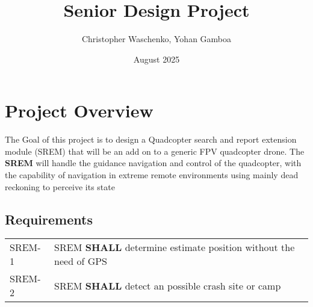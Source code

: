 \documentclass[12pt, letter]{article}
\author{Christopher Waschenko, Yohan Gamboa}
\title{Senior Design Project}
\date{August 2025}
\begin{document}
\maketitle
\newpage
\tableofcontents
\newpage

\section{Project Overview}

The Goal of this project is to design a Quadcopter search and report extension module (SREM) that will be an add on to a generic FPV quadcopter drone. The \textbf{SREM} will handle the guidance navigation and control of the quadcopter, with the capability of navigation in extreme remote environments using mainly dead reckoning to perceive its state

\subsection{Requirements}
\begin{tabular}{l l}
SREM-1 & SREM \textbf{SHALL} determine estimate position without the need of GPS \\
SREM-2 & SREM \textbf{SHALL} detect an possible crash site or camp \\
\end{tabular}
\end{document}
